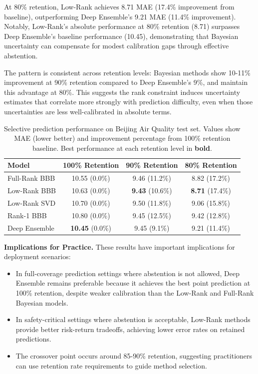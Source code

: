 \documentclass{article}
\theoremstyle{plain}
\theoremstyle{definition}
\theoremstyle{remark}
\begin{document}
At 80\% retention, Low-Rank achieves 8.71 MAE (17.4\% improvement from baseline), outperforming Deep Ensemble's 9.21 MAE (11.4\% improvement). Notably, Low-Rank's absolute performance at 80\% retention (8.71) surpasses Deep Ensemble's baseline performance (10.45), demonstrating that Bayesian uncertainty can compensate for modest calibration gaps through effective abstention.

The pattern is consistent across retention levels: Bayesian methods show 10-11\% improvement at 90\% retention compared to Deep Ensemble's 9\%, and maintain this advantage at 80\%. This suggests the rank constraint induces uncertainty estimates that correlate more strongly with prediction difficulty, even when those uncertainties are less well-calibrated in absolute terms.

\begin{table}[h]
\centering
\caption{Selective prediction performance on Beijing Air Quality test set. Values show MAE (lower better) and improvement percentage from 100\% retention baseline. Best performance at each retention level in \textbf{bold}.}
\label{tab:selective_pred_lstm}
\small
\begin{tabular}{lccc}
\toprule
\textbf{Model} & \textbf{100\% Retention} & \textbf{90\% Retention} & \textbf{80\% Retention} \\
\midrule
Full-Rank BBB & 10.55 (0.0\%) & 9.46 (11.2\%) & 8.82 (17.2\%) \\
Low-Rank BBB & 10.63 (0.0\%) & \textbf{9.43} (10.6\%) & \textbf{8.71} (17.4\%) \\
Low-Rank SVD & 10.70 (0.0\%) & 9.50 (11.8\%) & 9.06 (15.8\%) \\
Rank-1 BBB & 10.80 (0.0\%) & 9.45 (12.5\%) & 9.42 (12.8\%) \\
Deep Ensemble & \textbf{10.45} (0.0\%) & 9.45 (9.1\%) & 9.21 (11.4\%) \\
\bottomrule
\end{tabular}
\end{table}

\textbf{Implications for Practice.} These results have important implications for deployment scenarios:
\begin{itemize}
\item In full-coverage prediction settings where abstention is not allowed, Deep Ensemble remains preferable because it achieves the best point prediction at 100\% retention, despite weaker calibration than the Low-Rank and Full-Rank Bayesian models.

\item In safety-critical settings where abstention is acceptable, Low-Rank methods provide better risk-return tradeoffs, achieving lower error rates on retained predictions.
\item The crossover point occurs around 85-90\% retention, suggesting practitioners can use retention rate requirements to guide method selection.
\end{itemize}
\end{document}
